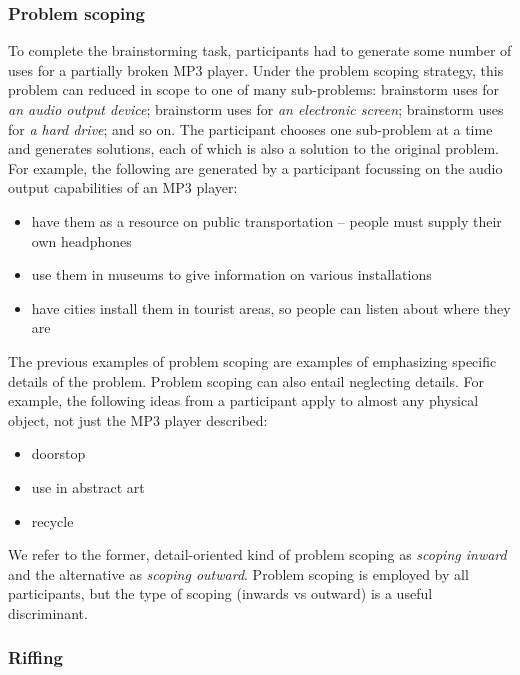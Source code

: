 \subsubsection{Problem scoping}

To complete the brainstorming task, participants had to generate some number of uses for a partially broken MP3 player. Under the problem scoping strategy, this problem can reduced in scope to one of many sub-problems: brainstorm uses for \emph{an audio output device}; brainstorm uses for \emph{an electronic screen}; brainstorm uses for \emph{a hard drive}; and so on. The participant chooses one sub-problem at a time and generates solutions, each of which is also a solution to the original problem. For example, the following are generated by a participant focussing on the audio output capabilities of an MP3 player:

\begin{itemize}
    \item have them as a resource on public transportation -- people must supply their own headphones
    \item use them in museums to give information on various installations
    \item have cities install them in tourist areas, so people can listen about where they are
\end{itemize}

The previous examples of problem scoping are examples of emphasizing specific details of the problem. Problem scoping can also entail neglecting details. For example, the following ideas from a participant apply to almost any physical object, not just the MP3 player described:

\begin{itemize}
    \item doorstop
    \item use in abstract art
    \item recycle
\end{itemize}

We refer to the former, detail-oriented kind of problem scoping as \emph{scoping inward} and the alternative as \emph{scoping outward}. Problem scoping is employed by all participants, but the type of scoping (inwards vs outward) is a useful discriminant.

\subsubsection{Riffing}

